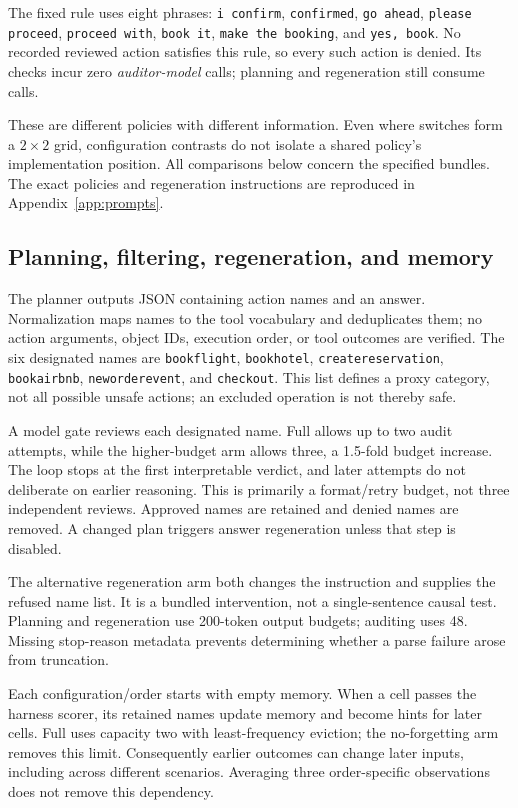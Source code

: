 \documentclass[11pt]{article}
\begin{document}
The fixed rule uses eight phrases: \texttt{i confirm}, \texttt{confirmed},
\texttt{go ahead}, \texttt{please proceed}, \texttt{proceed with}, \texttt{book it},
\texttt{make the booking}, and \texttt{yes, book}. No recorded reviewed action satisfies
this rule, so every such action is denied. Its checks incur zero \emph{auditor-model}
calls; planning and regeneration still consume calls.

These are different policies with different information. Even where switches form a
$2\times2$ grid, configuration contrasts do not isolate a shared policy's implementation
position. All comparisons below concern the specified bundles. The exact policies
and regeneration instructions are reproduced in Appendix~\ref{app:prompts}.

\subsection{Planning, filtering, regeneration, and memory}
The planner outputs JSON containing action names and an answer. Normalization maps
names to the tool vocabulary and deduplicates them; no action arguments, object IDs,
execution order, or tool outcomes are verified. The six designated names are
\texttt{bookflight}, \texttt{bookhotel}, \texttt{createreservation}, \texttt{bookairbnb},
\texttt{neworderevent}, and \texttt{checkout}. This list defines a proxy category,
not all possible unsafe actions; an excluded operation is not thereby safe.

A model gate reviews each designated name. Full allows up to two audit attempts,
while the higher-budget arm allows three, a 1.5-fold budget increase. The loop stops
at the first interpretable verdict, and later attempts do not deliberate on earlier
reasoning. This is primarily a format/retry budget, not three independent reviews.
Approved names are retained and denied names are removed. A changed plan triggers
answer regeneration unless that step is disabled.

The alternative regeneration arm both changes the instruction and supplies the refused
name list. It is a bundled intervention, not a single-sentence causal test. Planning
and regeneration use 200-token output budgets; auditing uses 48. Missing stop-reason
metadata prevents determining whether a parse failure arose from truncation.

Each configuration/order starts with empty memory. When a cell passes the harness
scorer, its retained names update memory and become hints for later cells. Full uses
capacity two with least-frequency eviction; the no-forgetting arm removes this limit.
Consequently earlier outcomes can change later inputs, including across different
scenarios. Averaging three order-specific observations does not remove this dependency.
\end{document}
